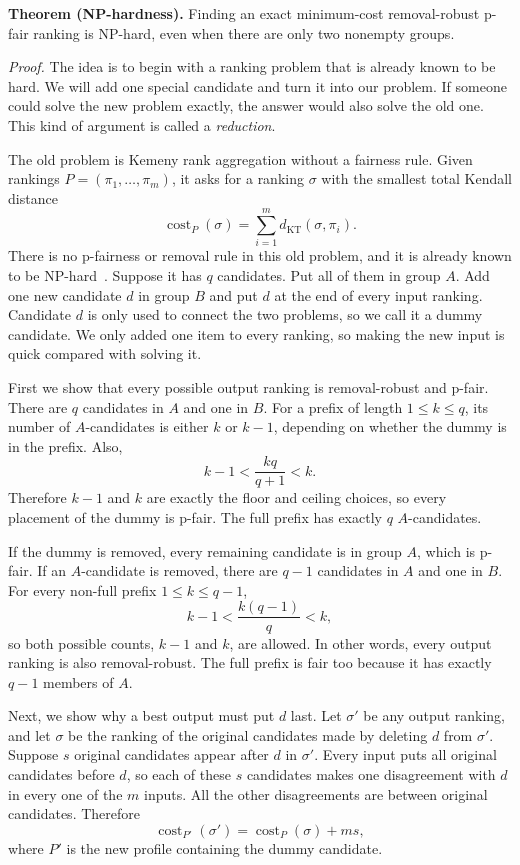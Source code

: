 \documentclass[11pt]{article}
\newcommand{\KT}{d_{\mathrm{KT}}}
\begin{document}
\medskip
\noindent\textbf{Theorem (NP-hardness).}
Finding an exact minimum-cost removal-robust p-fair ranking is NP-hard, even
when there are only two nonempty groups.
\medskip

\noindent\textit{Proof.}
The idea is to begin with a ranking problem that is already known to be hard.
We will add one special candidate and turn it into our problem.  If someone
could solve the new problem exactly, the answer would also solve the old one.
This kind of argument is called a \emph{reduction}.

The old problem is Kemeny rank aggregation without a fairness rule.  Given
rankings $P=(\pi_1,\ldots,\pi_m)$, it asks for a ranking $\sigma$ with the
smallest total Kendall distance
\[
 \operatorname{cost}_P(\sigma)
 =\sum_{i=1}^{m}\KT(\sigma,\pi_i).
\]
There is no p-fairness or removal rule in this old problem, and it is already
known to be NP-hard~\cite{dwork2001}.  Suppose it has $q$ candidates.  Put all
of them in group $A$.  Add one new candidate $d$ in group $B$ and put $d$ at
the end of every input ranking.  Candidate $d$ is only used to connect the two
problems, so we call it a dummy candidate.  We only added one item to every
ranking, so making the new input is quick compared with solving it.

First we show that every possible output ranking is removal-robust and p-fair.
There are $q$ candidates in $A$ and one in $B$.  For a prefix of length
$1\le k\le q$, its number of $A$-candidates is either $k$ or $k-1$, depending
on whether the dummy is in the prefix.  Also,
\[
 k-1 < \frac{kq}{q+1} < k.
\]
Therefore $k-1$ and $k$ are exactly the floor and ceiling choices, so every
placement of the dummy is p-fair.  The full prefix has exactly $q$
$A$-candidates.

If the dummy is removed, every remaining candidate is in group $A$, which is
p-fair.  If an $A$-candidate is removed, there are $q-1$ candidates in $A$
and one in $B$.  For every non-full prefix $1\le k\le q-1$,
\[
 k-1 < \frac{k(q-1)}{q} < k,
\]
so both possible counts, $k-1$ and $k$, are allowed.  In other words, every
output ranking is also removal-robust.  The full prefix is fair too because it
has exactly $q-1$ members of $A$.

Next, we show why a best output must put $d$ last.  Let $\sigma'$ be any
output ranking, and let $\sigma$ be the ranking of the original candidates
made by deleting $d$ from $\sigma'$.  Suppose $s$ original candidates appear
after $d$ in $\sigma'$.  Every input puts all original candidates before $d$,
so each of these $s$ candidates makes one disagreement with $d$ in every one
of the $m$ inputs.  All the other disagreements are between original
candidates.  Therefore
\[
 \operatorname{cost}_{P'}(\sigma')
 =\operatorname{cost}_{P}(\sigma)+ms,
\]
where $P'$ is the new profile containing the dummy candidate.
\end{document}
